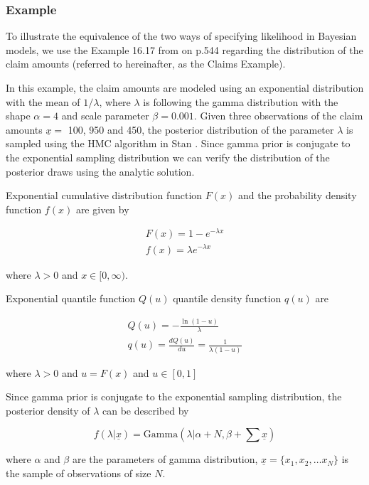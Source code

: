 \documentclass[
  12pt,
]{article}
\begin{document}
\hypertarget{example}{%
\subsubsection{Example}\label{example}}

To illustrate the equivalence of the two ways of specifying likelihood in Bayesian models, we use the Example 16.17 from \citet{klugman2004LossModelsData} on p.544 regarding the distribution of the claim amounts (referred to hereinafter, as the Claims Example).

In this example, the claim amounts are modeled using an exponential distribution with the mean of \(1/\lambda\), where \(\lambda\) is following the gamma distribution with the shape \(\alpha=4\) and scale parameter \(\beta=0.001\). Given three observations of the claim amounts \(\underline x=\) 100, 950 and 450, the posterior distribution of the parameter \(\lambda\) is sampled using the HMC algorithm in Stan \citep{standevelopmentteam2021RStanInterfaceStan}. Since gamma prior is conjugate to the exponential sampling distribution \citep{pratt1995IntroductionStatisticalDecision} we can verify the distribution of the posterior draws using the analytic solution.

Exponential cumulative distribution function \(F(x)\) and the probability density function \(f(x)\) are given by

\[
\begin{gathered}
F(x)=1-e^{-\lambda x} \\ 
f(x)=\lambda e^{-\lambda x}
\end{gathered}
\]

where \(\lambda>0\) and \(x\in[0,\infty)\).

Exponential quantile function \(Q(u)\) quantile density function \(q(u)\) are

\[
\begin{gathered}
Q(u)=-\frac{\ln(1-u)}{\lambda}\\ 
q(u)=\frac{dQ(u)}{du}=\frac{1}{\lambda(1-u)}
\end{gathered}
\]

where \(\lambda>0\) and \(u=F(x)\) and \(u \in [0,1]\)

Since gamma prior is conjugate to the exponential sampling distribution, the posterior density of \(\lambda\) can be described by

\[
f(\lambda|\underline{x})=\text{Gamma}(\lambda| \alpha+N, \beta+\sum \underline{x} )
\]

where \(\alpha\) and \(\beta\) are the parameters of gamma distribution, \(\underline{x}=\{x_1, x_2, \dots x_N\}\) is the sample of observations of size \(N\).
\end{document}
